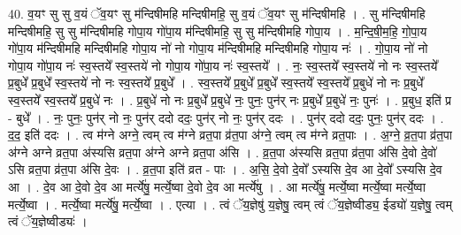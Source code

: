 \documentclass[17pt]{extarticle}
\begin{document}
40. व॒यꣳ सु सु व॒यं ॅव॒यꣳ सु म॑न्दिषीमहि मन्दिषीमहि॒ सु व॒यं ॅव॒यꣳ सु म॑न्दिषीमहि । . सु म॑न्दिषीमहि मन्दिषीमहि॒ सु सु म॑न्दिषीमहि गोपा॒य गो॑पा॒य म॑न्दिषीमहि॒ सु सु म॑न्दिषीमहि गोपा॒य । . म॒न्दि॒षी॒म॒हि॒ गो॒पा॒य गो॑पा॒य म॑न्दिषीमहि मन्दिषीमहि गोपा॒य नो॑ नो गोपा॒य म॑न्दिषीमहि मन्दिषीमहि गोपा॒य नः॑ । . गो॒पा॒य नो॑ नो गोपा॒य गो॑पा॒य नः॑ स्व॒स्तये᳚ स्व॒स्तये॑ नो गोपा॒य गो॑पा॒य नः॑ स्व॒स्तये᳚ । . नः॒ स्व॒स्तये᳚ स्व॒स्तये॑ नो नः स्व॒स्तये᳚ प्र॒बुधे᳚ प्र॒बुधे᳚ स्व॒स्तये॑ नो नः स्व॒स्तये᳚ प्र॒बुधे᳚ । . स्व॒स्तये᳚ प्र॒बुधे᳚ प्र॒बुधे᳚ स्व॒स्तये᳚ स्व॒स्तये᳚ प्र॒बुधे॑ नो नः प्र॒बुधे᳚ स्व॒स्तये᳚ स्व॒स्तये᳚ प्र॒बुधे॑ नः । . प्र॒बुधे॑ नो नः प्र॒बुधे᳚ प्र॒बुधे॑ नः॒ पुनः॒ पुन॑र् नः प्र॒बुधे᳚ प्र॒बुधे॑ नः॒ पुनः॑ । . प्र॒बुध॒ इति॑ प्र - बुधे᳚ । . नः॒ पुनः॒ पुन॑र् नो नः॒ पुन॑र् ददो ददः॒ पुन॑र् नो नः॒ पुन॑र् ददः । . पुन॑र् ददो ददः॒ पुनः॒ पुन॑र् ददः । . द॒द॒ इति॑ ददः । . त्व म॑ग्ने अग्ने॒ त्वम् त्व म॑ग्ने व्रत॒पा व्र॑त॒पा अ॑ग्ने॒ त्वम् त्व म॑ग्ने व्रत॒पाः । . अ॒ग्ने॒ व्र॒त॒पा व्र॑त॒पा अ॑ग्ने अग्ने व्रत॒पा अ॑स्यसि व्रत॒पा अ॑ग्ने अग्ने व्रत॒पा अ॑सि । . व्र॒त॒पा अ॑स्यसि व्रत॒पा व्र॑त॒पा अ॑सि दे॒वो दे॒वो॑ ऽसि व्रत॒पा व्र॑त॒पा अ॑सि दे॒वः । . व्र॒त॒पा इति॑ व्रत - पाः । . अ॒सि॒ दे॒वो दे॒वो᳚ ऽस्यसि दे॒व आ दे॒वो᳚ ऽस्यसि दे॒व आ । . दे॒व आ दे॒वो दे॒व आ मर्त्ये॑षु॒ मर्त्ये॒ष्वा दे॒वो दे॒व आ मर्त्ये॑षु । . आ मर्त्ये॑षु॒ मर्त्ये॒ष्वा मर्त्ये॒ष्वा मर्त्ये॒ष्वा मर्त्ये॒ष्वा । . मर्त्ये॒ष्वा मर्त्ये॑षु॒ मर्त्ये॒ष्वा । . एत्या । . त्वं ॅय॒ज्ञेषु॑ य॒ज्ञेषु॒ त्वम् त्वं ॅय॒ज्ञेष्वीड्य॒ ईड्यो॑ य॒ज्ञेषु॒ त्वम् त्वं ॅय॒ज्ञेष्वीड्यः॑ । \newline
\pagebreak
{}
\end{document}
